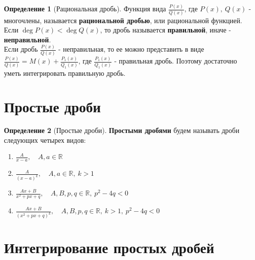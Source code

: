 \documentclass{report}
\theoremstyle{definition}
\newtheorem*{definition}{Определение}
\begin{document}
\begin{definition}[Рациональная дробь]
    Функция вида \(\frac{P(x)}{Q(x)}\), где \(P(x), \ Q(x)\) - многочлены, называется \textbf{рациональной дробью},
    или рациональной функцией. \\
    Если \(\deg P(x) < \deg Q(x)\), то дробь называется \textbf{правильной}, иначе - \textbf{неправильной}. \\
    Если дробь \(\frac{P(x)}{Q(x)}\) - неправильная, то ее можно представить в виде \(\frac{P(x)}{Q(x)} = M(x) +
    \frac{P_{1}(x)}{Q_{1}(x)}\), где \(\frac{P_{1}(x)}{Q_{1}(x)}\) - правильная дробь. Поэтому достаточно уметь
    интегрировать правильную дробь.
\end{definition}

\section{Простые дроби}

\begin{definition}[Простые дроби]
    \textbf{Простыми дробями} будем называть дроби следующих четырех видов:
    \begin{enumerate}
        \item \(\frac{A}{x - a}, \quad A,a \in \mathbb{R}\)
        \item \(\frac{A}{(x - a)^{k}}, \quad A,a \in \mathbb{R}, \ k > 1\)
        \item \(\frac{Ax + B}{x^{2} + px + q}, \quad A,B,p,q \in \mathbb{R}, \ p^{2} - 4q < 0\)
        \item \(\frac{Ax + B}{(x^{2} + px + q)^{k}}, \quad A,B,p,q \in \mathbb{R}, \ k > 1, \ p^{2} - 4q < 0\)
    \end{enumerate}
\end{definition}

\clearpage

\section{Интегрирование простых дробей}
\end{document}
